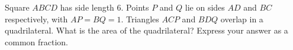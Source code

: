 Square $ABCD$ has side length $6$. Points $P$ and $Q$ lie on sides $AD$ and $BC$ respectively, with $AP=BQ=1$. Triangles $ACP$ and $BDQ$ overlap in a quadrilateral. What is the area of the quadrilateral? Express your answer as a common fraction.
